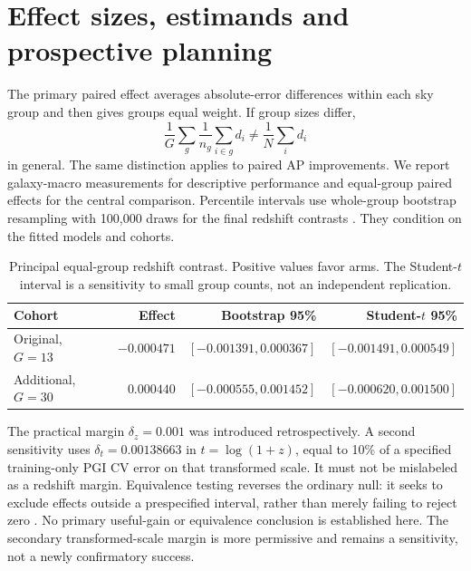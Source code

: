 \documentclass[10pt]{article}
\begin{document}
\section{Effect sizes, estimands and prospective planning}
The primary paired effect averages absolute-error differences within each
sky group and then gives groups equal weight. If group sizes differ,
\begin{equation}
 \frac{1}{G}\sum_g\frac{1}{n_g}\sum_{i\in g}d_i
 \ne \frac{1}{N}\sum_i d_i
\end{equation}
in general. The same distinction applies to paired AP improvements. We report
galaxy-macro measurements for descriptive performance and equal-group paired
effects for the central comparison. Percentile intervals use whole-group
bootstrap resampling with 100,000 draws for the final redshift contrasts
\citep{efron1979}. They condition on the fitted models and cohorts.

\begin{table}[htb]
\centering\small
\caption{Principal equal-group redshift contrast. Positive values favor arms.
The Student-$t$ interval is a sensitivity to small group counts, not an
independent replication.}
\begin{tabular}{lrrr}
\toprule
Cohort & Effect & Bootstrap 95\% & Student-$t$ 95\%\\
\midrule
Original, $G=13$ & $-0.000471$ & $[-0.001391,0.000367]$ & $[-0.001491,0.000549]$\\
Additional, $G=30$ & $0.000440$ & $[-0.000555,0.001452]$ & $[-0.000620,0.001500]$\\
\bottomrule
\end{tabular}
\end{table}

The practical margin $\delta_z=0.001$ was introduced retrospectively. A second
sensitivity uses $\delta_t=0.00138663$ in $t=\log(1+z)$, equal to 10\% of a
specified training-only PGI CV error on that transformed scale. It must not
be mislabeled as a redshift margin. Equivalence testing reverses the ordinary
null: it seeks to exclude effects outside a prespecified interval, rather than
merely failing to reject zero \citep{schuirmann1987}. No primary useful-gain
or equivalence conclusion is established here. The secondary transformed-scale
margin is more permissive and remains a sensitivity, not a newly confirmatory
success.
\end{document}
